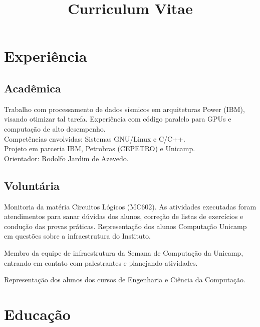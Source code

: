 \documentclass[10pt, a4paper, roman]{moderncv} %
\title{Curriculum Vitae}
\begin{document}
\makecvtitle %

\section{Experiência}

\subsection{Acadêmica}
{
    Trabalho com processamento de dados sísmicos em arquiteturas Power (IBM), visando otimizar tal tarefa. Experiência com código paralelo
    para GPUs e computação de alto desempenho.\\
    Competências envolvidas: Sistemas GNU/Linux e C/C++.\\ 
    Projeto em parceria IBM, Petrobras (CEPETRO) e Unicamp.\\
    Orientador: Rodolfo Jardim de Azevedo.
}

\bigskip

\subsection{Voluntária}
{
    Monitoria da matéria Circuitos Lógicos (MC602). As atividades executadas foram atendimentos para sanar dúvidas 
    dos alunos, correção de listas de exercícios e condução das provas práticas.
}
{
Representação dos alunos Computação Unicamp em questões sobre a 
    infraestrutura do Instituto.
}

{
Membro da equipe de infraestrutura da Semana de Computação da Unicamp, entrando em contato com palestrantes e planejando atividades.
}

{
Representação dos alunos dos cursos de Engenharia e Ciência da Computação.
}

\section{Educação}

\end{document}
